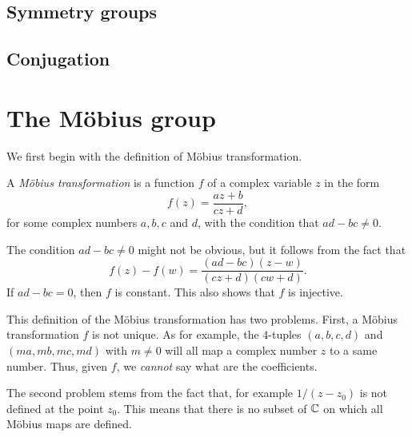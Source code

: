 \documentclass[main.tex]{subfiles}
\begin{document}
	\subsection{Symmetry groups}
	
	\subsection{Conjugation}
	
	\section{The M\"obius group}
		We first begin with the definition of M\"obius transformation.
		\begin{definition}
			A \textit{M\"obius transformation} is a function $f$ of a complex variable $z$ in the form
			\begin{equation*}
				f(z) = \frac{az + b}{cz + d},
			\end{equation*}
			for some complex numbers $a, b, c$ and $d$, with the condition that $ad - bc \neq 0$.
		\end{definition}
		The condition $ad - bc \neq 0$ might not be obvious, but it follows from the fact that
		\begin{equation*}
			f(z) - f(w) = \frac{(ad - bc)(z - w)}{(cz+d)(cw + d)}.
		\end{equation*}
		If $ad - bc = 0$, then $f$ is constant. This also shows that $f$ is injective.
		
		This definition of the M\"obius transformation has two problems. First, a M\"obius transformation $f$ is not unique. As for example, the 4-tuples $(a,b,c,d)$ and $(ma, mb, mc, md)$ with $m \neq 0$ will all map a complex number $z$ to a same number. Thus, given $f$, we \textit{cannot} say what are the coefficients.
		
		The second problem stems from the fact that, for example $1/(z - z_0)$ is not defined at the point $z_0$. This means that there is no subset of $\mathbb C$ on which all M\"obius maps are defined.
		
\end{document}

